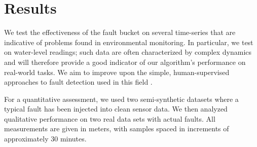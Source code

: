 \documentclass{article}
\begin{document}
\section{Results}
We test the effectiveness of the fault bucket on several time-series
that are indicative of problems found in environmental
monitoring. In particular, we test on water-level readings; such data
are often characterized by complex dynamics and will therefore provide
a good indicator of our algorithm's performance on real-world
tasks. We aim to improve upon the simple, human-supervised approaches
to fault detection used in this field
\citep{wagner2006guidelines}. 


For a quantitative assessment, we used two semi-synthetic datasets
where a typical fault has been injected into clean sensor data. We
then analyzed qualitative performance on two real data sets with actual
faults. All measurements are given in meters, with samples spaced in
increments of approximately 30 minutes. %


\end{document}

